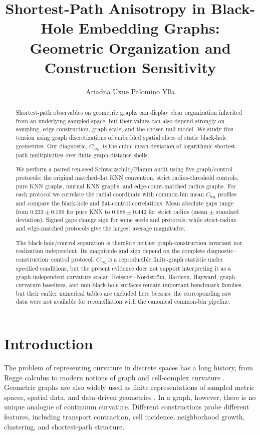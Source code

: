 \documentclass[11pt,a4paper]{article}
\title{
Shortest-Path Anisotropy in Black-Hole Embedding Graphs:\\
Geometric Organization and Construction Sensitivity
}
\author[1]{Ariadna Uxue Palomino Ylla}
\affil[1]{Department of Physics, Nagoya University, Nagoya, Japan}
\date{}
\begin{document}
\maketitle

\begin{abstract}
Shortest-path observables on geometric graphs can display clear organization inherited from an underlying sampled space, but their values can also depend strongly on sampling, edge construction, graph scale, and the chosen null model. We study this tension using graph discretizations of embedded spatial slices of static black-hole geometries. Our diagnostic, $C_{\log}$, is the cubic mean deviation of logarithmic shortest-path multiplicities over finite graph-distance shells.

We perform a paired ten-seed Schwarzschild/Flamm audit using five graph/control protocols: the original matched-flat KNN convention, strict radius-threshold controls, pure KNN graphs, mutual KNN graphs, and edge-count-matched radius graphs. For each protocol we correlate the radial coordinate with common-bin mean $C_{\log}$ profiles and compare the black-hole and flat-control correlations. Mean absolute gaps range from $0.233\pm0.199$ for pure KNN to $0.688\pm0.442$ for strict radius (mean $\pm$ standard deviation). Signed gaps change sign for some seeds and protocols, while strict-radius and edge-matched protocols give the largest average magnitudes.

The black-hole/control separation is therefore neither graph-construction invariant nor realization independent. Its magnitude and sign depend on the complete diagnostic--construction--control protocol. $C_{\log}$ is a reproducible finite-graph statistic under specified conditions, but the present evidence does not support interpreting it as a graph-independent curvature scalar. Reissner--Nordstr\"om, Bardeen, Hayward, graph-curvature baselines, and non-black-hole surfaces remain important benchmark families, but their earlier numerical tables are excluded here because the corresponding raw data were not available for reconciliation with the canonical common-bin pipeline.
\end{abstract}

\section{Introduction}
\label{sec:introduction}

The problem of representing curvature in discrete spaces has a long history, from Regge calculus \cite{Regge1961} to modern notions of graph and cell-complex curvature \cite{Forman2003,Ollivier2009,JostLiu2014}. Geometric graphs are also widely used as finite representations of sampled metric spaces, spatial data, and data-driven geometries \cite{Penrose2003,DallChristensen2002,Newman2010}. In a graph, however, there is no unique analogue of continuum curvature. Different constructions probe different features, including transport contraction, cell incidence, neighborhood growth, clustering, and shortest-path structure.
\end{document}
